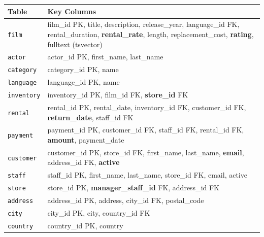 \documentclass[11pt,a4paper]{article}
\begin{document}
\vspace{0.5em}
\begin{center}
\end{center}

\vspace{0.8em}
\begin{schemabox}
\small
\begin{tabularx}{\linewidth}{@{} l X @{}}
\toprule
\textbf{Table} & \textbf{Key Columns} \\
\midrule
\texttt{film}       & film\_id PK, title, description, release\_year, language\_id FK, rental\_duration, \textbf{rental\_rate}, length, replacement\_cost, \textbf{rating}, fulltext (tsvector) \\
\texttt{actor}      & actor\_id PK, first\_name, last\_name \\
\texttt{category}   & category\_id PK, name \\
\texttt{language}   & language\_id PK, name \\
\texttt{inventory}  & inventory\_id PK, film\_id FK, \textbf{store\_id} FK \\
\texttt{rental}     & rental\_id PK, rental\_date, inventory\_id FK, customer\_id FK, \textbf{return\_date}, staff\_id FK \\
\texttt{payment}    & payment\_id PK, customer\_id FK, staff\_id FK, rental\_id FK, \textbf{amount}, payment\_date \\
\texttt{customer}   & customer\_id PK, store\_id FK, first\_name, last\_name, \textbf{email}, address\_id FK, \textbf{active} \\
\texttt{staff}      & staff\_id PK, first\_name, last\_name, store\_id FK, email, active \\
\texttt{store}      & store\_id PK, \textbf{manager\_staff\_id} FK, address\_id FK \\
\texttt{address}    & address\_id PK, address, city\_id FK, postal\_code \\
\texttt{city}       & city\_id PK, city, country\_id FK \\
\texttt{country}    & country\_id PK, country \\
\bottomrule
\end{tabularx}
\end{schemabox}
\end{document}
